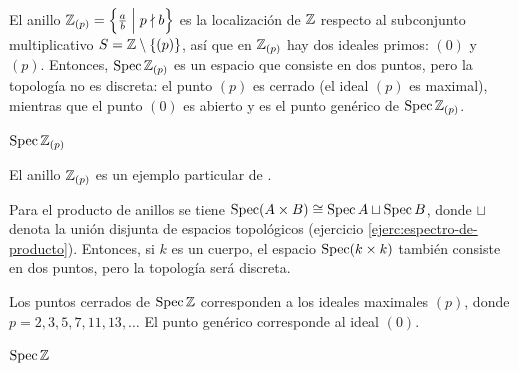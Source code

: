 \documentclass{article}
\numberwithin{equation}{section}
\theoremstyle{definition}
\begin{document}
\begin{ejemplo}
  El anillo $\mathbb{Z}_{(p)} = \Bigl\{ \frac{a}{b} \Bigm| p\nmid b \Bigr\}$ es
  la localización de $\mathbb{Z}$ respecto al subconjunto multiplicativo
  $S = \mathbb{Z} \setminus \{ (p) \}$, así que en $\mathbb{Z}_{(p)}$ hay dos ideales primos:
  $(0)$ y $(p)$. Entonces, $\operatorname{Spec} \mathbb{Z}_{(p)}$ es un espacio que consiste en dos
  puntos, pero la topología no es discreta: el punto $(p)$ es cerrado (el ideal
  $(p)$ es maximal), mientras que el punto $(0)$ es abierto y es el punto
  genérico de $\operatorname{Spec} \mathbb{Z}_{(p)}$.

  \begin{center}

    $\operatorname{Spec} \mathbb{Z}_{(p)}$
  \end{center}

  El anillo $\mathbb{Z}_{(p)}$ es un ejemplo particular de .
\end{ejemplo}

\begin{ejemplo}
  Para el producto de anillos se tiene
  $\operatorname{Spec} (A\times B) \cong \operatorname{Spec} A \sqcup \operatorname{Spec} B$, donde $\sqcup$ denota
  la unión disjunta de espacios topológicos (ejercicio
  \ref{ejerc:espectro-de-producto}). Entonces, si $k$ es un cuerpo, el espacio
  $\operatorname{Spec} (k\times k)$ también consiste en dos puntos, pero la topología será
  discreta.
\end{ejemplo}

\begin{ejemplo}
  Los puntos cerrados de $\operatorname{Spec} \mathbb{Z}$ corresponden a los ideales maximales $(p)$,
  donde $p = 2,3,5,7,11,13,\ldots$ El punto genérico corresponde al ideal $(0)$.

  \begin{center}

    $\operatorname{Spec} \mathbb{Z}$
  \end{center}
\end{ejemplo}
\end{document}
